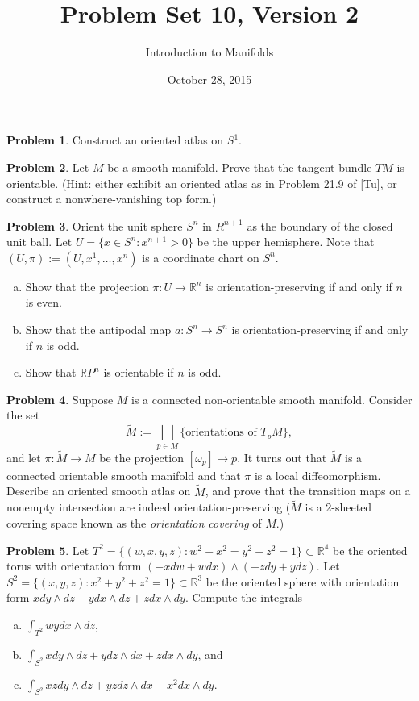 \documentclass{amsart}
\newcommand{\+}[1]{\ensuremath{\mathbf{#1}}}
\newcommand{\R}{{\mathbb R}}
\theoremstyle{definition}
\newtheorem{prob}{Problem}
\begin{document}
\title{Problem Set 10, Version 2}
\date{October 28, 2015}
\author{Introduction to Manifolds}

\maketitle

\begin{prob}
Construct an oriented atlas on $S^1$.
\end{prob}

\begin{prob}
Let $M$ be a smooth manifold.  Prove that the tangent bundle
$TM$ is orientable.  (Hint: either exhibit an oriented atlas
as in Problem 21.9 of [Tu], or construct a nonwhere-vanishing
top form.)
\end{prob}

\begin{prob}
Orient the unit sphere $S^n$ in $R^{n+1}$ as the boundary
of the closed unit ball.  Let $U = \{x \in S^n: x^{n+1}>0\}$ 
be the upper hemisphere.  Note that $(U,\pi) := (U,x^1,\ldots,x^n)$
is a coordinate chart on $S^n$.
\begin{enumerate}[(a)]
 \item Show that the projection $\pi: U \to \R^n$ is
 orientation-preserving if and only if $n$ is even.
 \item Show that the antipodal map $a: S^n \to S^n$
 is orientation-preserving if and only if $n$ is odd.
 \item Show that $\R P^n$ is orientable if $n$ is odd.
\end{enumerate}
\end{prob}


\begin{prob}
Suppose $M$ is a connected non-orientable smooth manifold.
Consider the set
\[
\tilde{M} := \bigsqcup_{p \in M} \{\text{orientations of } T_pM\},
\]
and let $\pi:\tilde{M} \to M$ be the projection $[\omega_p] \mapsto p$.  It turns out that $\tilde{M}$ is a connected
orientable smooth manifold and that $\pi$ is a local diffeomorphism. 
Describe an {\color{red} oriented} smooth atlas on $\tilde{M}$, and prove that the
transition maps on a nonempty intersection are indeed orientation-preserving
($\tilde{M}$ is a $2$-sheeted covering space known as the \emph{orientation covering} of $M$.)
\end{prob}

\begin{prob}
Let $T^2 = \{(w,x,y,z): w^2 + x^2 = y^2 + z^2 =1\} \subset \R^4$ be the oriented torus with
orientation form $(-x dw + w dx) \wedge (-z dy + y dz)$.
Let $S^2 = \{(x,y,z): x^2 + y^2 + z^2 = 1\} \subset \R^3$
be the oriented sphere with orientation form
$x dy \wedge dz - y dx \wedge dz + z dx \wedge dy$.
Compute the integrals
\begin{enumerate}[(a)]
 \item  $\int_{T^2} wy dx \wedge dz$,
 \item  $\int_{S^2} x dy \wedge dz + y dz \wedge dx + z dx \wedge dy$, and 
 \item  $\int_{S^2} xz dy \wedge dz + yz dz \wedge dx + x^2 dx \wedge dy$.
\end{enumerate}
\end{prob}
\end{document}
